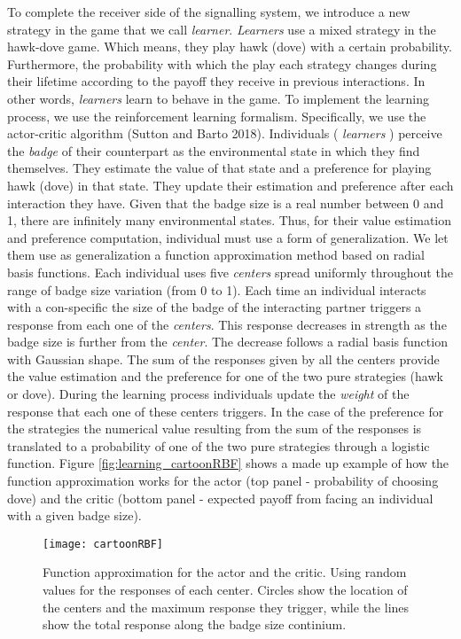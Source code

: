 \documentclass[]{article}
\begin{document}
To complete the receiver side of the signalling system, we introduce a
new strategy in the game that we call \emph{learner}. \emph{Learners}
use a mixed strategy in the hawk-dove game. Which means, they play hawk
(dove) with a certain probability. Furthermore, the probability with
which the play each strategy changes during their lifetime according to
the payoff they receive in previous interactions. In other words,
\emph{learners} learn to behave in the game. To implement the learning
process, we use the reinforcement learning formalism. Specifically, we
use the actor-critic algorithm (Sutton and Barto 2018). Individuals (
\emph{learners} ) perceive the \emph{badge} of their counterpart as the
environmental state in which they find themselves. They estimate the
value of that state and a preference for playing hawk (dove) in that
state. They update their estimation and preference after each
interaction they have. Given that the badge size is a real number
between 0 and 1, there are infinitely many environmental states. Thus,
for their value estimation and preference computation, individual must
use a form of generalization. We let them use as generalization a
function approximation method based on radial basis functions. Each
individual uses five \emph{centers} spread uniformly throughout the
range of badge size variation (from 0 to 1). Each time an individual
interacts with a con-specific the size of the badge of the interacting
partner triggers a response from each one of the \emph{centers}. This
response decreases in strength as the badge size is further from the
\emph{center}. The decrease follows a radial basis function with
Gaussian shape. The sum of the responses given by all the centers
provide the value estimation and the preference for one of the two pure
strategies (hawk or dove). During the learning process individuals
update the \emph{weight} of the response that each one of these centers
triggers. In the case of the preference for the strategies the numerical
value resulting from the sum of the responses is translated to a
probability of one of the two pure strategies through a logistic
function. Figure \ref{fig:learning_cartoonRBF} shows a made up example
of how the function approximation works for the actor (top panel -
probability of choosing dove) and the critic (bottom panel - expected
payoff from facing an individual with a given badge size).

\begin{figure}
\texttt{[image: cartoonRBF]} \caption{\label{fig:learning_cartoonRBF}Function approximation for the actor and the critic. Using random values for the responses of each center. Circles show the location of the centers and the maximum response they trigger, while the lines show the total response along the badge size continium.}\label{fig:fig2}
\end{figure}
\end{document}
